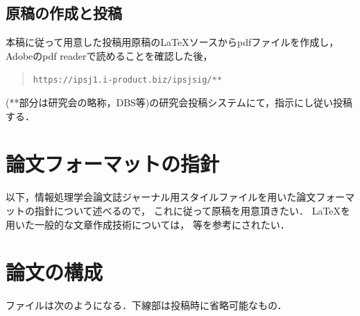 \documentclass[submit,techrep,noauthor]{ipsj-lualatex}
\def\|{\verb|}
\begin{document}
%2.2
\subsection{原稿の作成と投稿}

本稿に従って用意した投稿用原稿の\LaTeX ソースからpdfファイルを作成し，
Adobeのpdf readerで読めることを確認した後，
\begin{quote}
\small
\|https://ipsj1.i-product.biz/ipsjsig/**|
\end{quote}
(**部分は研究会の略称，DBS等)の研究会投稿システムにて，指示にし従い投稿する．







\section{論文フォーマットの指針}
\label{sec:format}

以下，情報処理学会論文誌ジャーナル用スタイルファイルを用いた論文フォーマットの指針について述べるので，
これに従って原稿を用意頂きたい．
\LaTeX を用いた一般的な文章作成技術については，
\cite{okumura, companion} 等を参考にされたい．



\section{論文の構成}
\label{config}

ファイルは次のようになる．下線部は投稿時に省略可能なもの．
\end{document}
